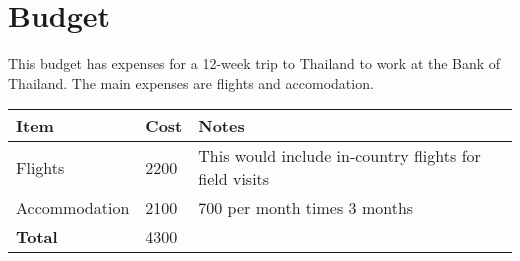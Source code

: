 \documentclass[12pt]{article}
\begin{document}
\section*{Budget}
This budget has expenses for a 12-week trip to Thailand to work at the Bank of Thailand. The main expenses are flights and accomodation. 

\begin{table}[H]
  \centering
  \begin{tabular}{|l|l|l|}
  \hline
  \textbf{Item}  & \textbf{Cost} & \textbf{Notes}                                         \\ \hline
  Flights        & 2200          & This would include in-country flights for field visits \\ \hline
  Accommodation   & 2100          &  700 per month times 3 months                          \\ \hline
  \textbf{Total} & 4300 & \\ \hline
  \end{tabular}
  \end{table}
\end{document}
